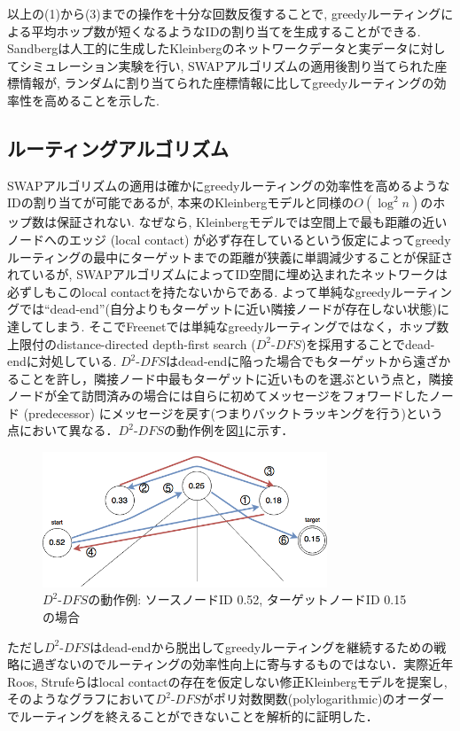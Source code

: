 \documentclass[technicalreport]{./ieicej-v3.0/UTF/ieicej}
\begin{document}
   以上の(1)から(3)までの操作を十分な回数反復することで, greedyルーティングによる平均ホップ数が短くなるようなIDの割り当てを生成することができる. Sandbergは人工的に生成したKleinbergのネットワークデータと実データに対してシミュレーション実験を行い, SWAPアルゴリズムの適用後割り当てられた座標情報が, ランダムに割り当てられた座標情報に比してgreedyルーティングの効率性を高めることを示した.
   \subsection{ルーティングアルゴリズム}
   SWAPアルゴリズムの適用は確かにgreedyルーティングの効率性を高めるようなIDの割り当てが可能であるが, 本来のKleinbergモデルと同様の$O(\log^2n)$のホップ数は保証されない. なぜなら, Kleinbergモデルでは空間上で最も距離の近いノードへのエッジ (local contact) が必ず存在しているという仮定によってgreedyルーティングの最中にターゲットまでの距離が狭義に単調減少することが保証されているが, SWAPアルゴリズムによってID空間に埋め込まれたネットワークは必ずしもこのlocal contactを持たないからである. よって単純なgreedyルーティングでは``dead-end''(自分よりもターゲットに近い隣接ノードが存在しない状態)に達してしまう. そこでFreenetでは単純なgreedyルーティングではなく，ホップ数上限付のdistance-directed depth-first search ($D^2$-$DFS$)を採用することでdead-endに対処している\cite{clarke2001freenet}. $D^2$-$DFS$はdead-endに陥った場合でもターゲットから遠ざかることを許し，隣接ノード中最もターゲットに近いものを選ぶという点と，隣接ノードが全て訪問済みの場合には自らに初めてメッセージをフォワードしたノード (predecessor) にメッセージを戻す(つまりバックトラッキングを行う)という点において異なる．$D^2$-$DFS$の動作例を図\ref{fig:d2dfs_example}に示す．

   \begin{figure}[htb]
    \centerline{\includegraphics[width=85mm]{../fig/d2dfs_example.png}}
    \caption{$D^2$-$DFS$の動作例: ソースノードID 0.52, ターゲットノードID 0.15の場合}
    \label{fig:d2dfs_example}
   \end{figure}

   ただし$D^2$-$DFS$はdead-endから脱出してgreedyルーティングを継続するための戦略に過ぎないのでルーティングの効率性向上に寄与するものではない．実際近年Roos, Strufeらはlocal contactの存在を仮定しない修正Kleinbergモデルを提案し, そのようなグラフにおいて$D^2$-$DFS$がポリ対数関数(polylogarithmic)のオーダーでルーティングを終えることができないことを解析的に証明した\cite{roos2016dealing}． 
\end{document}
